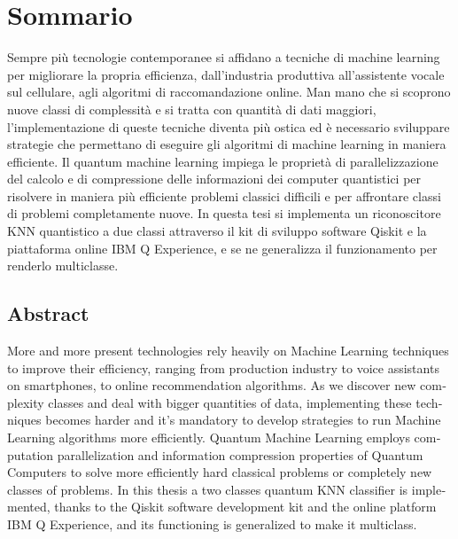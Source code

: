 \begingroup
\let\clearpage\relax
\let\cleardoublepage\relax
\let\cleardoublepage\relax

\chapter*{Sommario}
Sempre più tecnologie contemporanee si affidano a tecniche di machine 
learning per migliorare la propria efficienza, dall'industria produttiva 
all'assistente vocale sul cellulare, agli algoritmi di raccomandazione online. 
Man mano che si scoprono nuove classi di complessità e si tratta con 
quantità di dati maggiori, l'implementazione di queste tecniche diventa più 
ostica ed è necessario sviluppare strategie che permettano di eseguire 
gli algoritmi di machine learning in maniera efficiente. 
Il quantum machine learning impiega le proprietà di parallelizzazione del 
calcolo e di compressione delle informazioni dei computer quantistici per 
risolvere in maniera più efficiente problemi classici difficili e per 
affrontare classi di problemi completamente nuove. 
In questa tesi si implementa un riconoscitore KNN quantistico a due classi 
attraverso il kit di sviluppo software Qiskit e la piattaforma online 
IBM Q Experience, 
e se ne generalizza il funzionamento per renderlo multiclasse. 



\vfill

\begin{otherlanguage}{english}
\chapter*{Abstract}
More and more present technologies rely heavily on Machine Learning techniques 
to improve their efficiency, ranging from production industry to voice 
assistants on smartphones, to online recommendation algorithms. 
As we discover new complexity classes and deal with bigger quantities of data, 
implementing these techniques becomes harder and it's mandatory to develop 
strategies to run Machine Learning algorithms more efficiently. 
Quantum Machine Learning employs computation parallelization and information 
compression properties of Quantum Computers to solve more efficiently hard 
classical problems or completely new classes of problems. 
In this thesis a two classes quantum KNN classifier is implemented, thanks 
to the Qiskit software development kit and the online platform IBM Q 
Experience, and its functioning is generalized to make it multiclass. 
\end{otherlanguage}

\endgroup

\vfill
